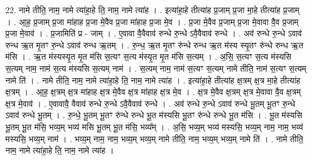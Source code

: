 \documentclass[17pt]{extarticle}
\begin{document}
22. नामे तीति॒ नाम॒ नामे त्या॑हा॒हे ति॒ नाम॒ नामे त्या॑ह । . इत्या॑हा॒हे तीत्या॑ह प्र॒जाम् प्र॒जा मा॒हे तीत्या॑ह प्र॒जाम् । . आ॒ह॒ प्र॒जाम् प्र॒जा मा॑हाह प्र॒जा मे॒वैव प्र॒जा मा॑हाह प्र॒जा मे॒व । . प्र॒जा मे॒वैव प्र॒जाम् प्र॒जा मे॒वावा वै॒व प्र॒जाम् प्र॒जा मे॒वाव॑ । . प्र॒जामिति॑ प्र - जाम् । . ए॒वावा वै॒वैवाव॑ रुन्धे रु॒न्धे ऽवै॒वैवाव॑ रुन्धे । . अव॑ रुन्धे रु॒न्धे ऽवाव॑ रुन्ध ऋ॒त मृ॒तꣳ रु॒न्धे ऽवाव॑ रुन्ध ऋ॒तम् । . रु॒न्ध॒ ऋ॒त मृ॒तꣳ रु॑न्धे रुन्ध ऋ॒त म॑स्य स्यृ॒तꣳ रु॑न्धे रुन्ध ऋ॒त म॑सि । . ऋ॒त म॑स्यस्यृ॒त मृ॒त म॑सि स॒त्यꣳ स॒त्य म॑स्यृ॒त मृ॒त म॑सि स॒त्यम् । . अ॒सि॒ स॒त्यꣳ स॒त्य म॑स्यसि स॒त्यम् नाम॒ नाम॑ स॒त्य म॑स्यसि स॒त्यम् नाम॑ । . स॒त्यम् नाम॒ नाम॑ स॒त्यꣳ स॒त्यम् नामे तीति॒ नाम॑ स॒त्यꣳ स॒त्यम् नामे ति॑ । . नामे तीति॒ नाम॒ नामे त्या॑हा॒हे ति॒ नाम॒ नामे त्या॑ह । . इत्या॑हा॒हे तीत्या॑ह क्ष॒त्रम् क्ष॒त्र मा॒हे तीत्या॑ह क्ष॒त्रम् । . आ॒ह॒ क्ष॒त्रम् क्ष॒त्र मा॑हाह क्ष॒त्र मे॒वैव क्ष॒त्र मा॑हाह क्ष॒त्र मे॒व । . क्ष॒त्र मे॒वैव क्ष॒त्रम् क्ष॒त्र मे॒वावा वै॒व क्ष॒त्रम् क्ष॒त्र मे॒वाव॑ । . ए॒वावावै॒ वैवाव॑ रुन्धे रु॒न्धे ऽवै॒वैवाव॑ रुन्धे । . अव॑ रुन्धे रु॒न्धे ऽवाव॑ रुन्धे भू॒तम् भू॒तꣳ रु॒न्धे ऽवाव॑ रुन्धे भू॒तम् । . रु॒न्धे॒ भू॒तम् भू॒तꣳ रु॑न्धे रुन्धे भू॒त म॑स्यसि भू॒तꣳ रु॑न्धे रुन्धे भू॒त म॑सि । . भू॒त म॑स्यसि भू॒तम् भू॒त म॑सि॒ भव्य॒म् भव्य॑ मसि भू॒तम् भू॒त म॑सि॒ भव्य᳚म् । . अ॒सि॒ भव्य॒म् भव्य॑ मस्यसि॒ भव्य॒म् नाम॒ नाम॒ भव्य॑ मस्यसि॒ भव्य॒म् नाम॑ । . भव्य॒म् नाम॒ नाम॒ भव्य॒म् भव्य॒म् नामे तीति॒ नाम॒ भव्य॒म् भव्य॒म् नामे ति॑ । . नामे तीति॒ नाम॒ नामे त्या॑हा॒हे ति॒ नाम॒ नामे त्या॑ह । \newline
\end{document}

